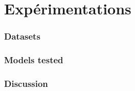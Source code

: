 \chapter{Expérimentations}     %
\label{chap:experiments}                   %

\subsection{Datasets}

\subsection{Models tested}

\subsection{Discussion}